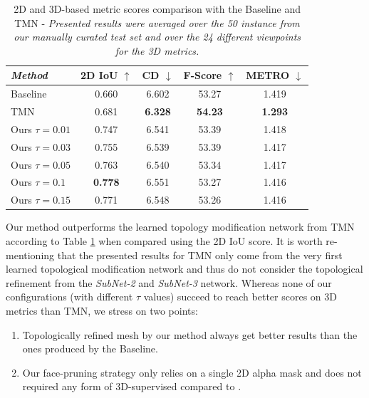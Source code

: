 \begin{table}[htp!]
\begin{center}
\caption{2D and 3D-based metric scores comparison with the Baseline and TMN\citep{pan2019deep} - \textit{Presented results were averaged over the 50 instance from our manually curated test set and over the 24 different viewpoints for the 3D metrics.}} 
\label{tab:sota_table}

\begin{tabular}{|l|c|c|c|c|}
\hline
\textit{Method} & 2D IoU $\uparrow$   & CD $\downarrow$  &F-Score $\uparrow$ & METRO $\downarrow$ \\ 
 \hline\hline
Baseline & 0.660  &  6.602  & 53.27  &  1.419      \\ 
\hline
TMN\citep{pan2019deep} & 0.681  & \textbf{6.328}   & \textbf{54.23}  & \textbf{1.293} \\ 
\hline
Ours $\scriptstyle \tau=0.01$ & 0.747 & 6.541  &  53.39 &  1.418      \\
\hline
Ours $\scriptstyle \tau=0.03$ & 0.755 &6.539  & 53.39  &    1.417  \\
\hline
Ours $\scriptstyle \tau=0.05$ & 0.763 & 6.540  &   53.34 &   1.417     \\
\hline
Ours $\scriptstyle \tau=0.1$ & \textbf{0.778} & 6.551  & 53.27 &  1.416     \\
\hline
Ours $\scriptstyle \tau=0.15$ & 0.771 & 6.548  & 53.26  &    1.416   \\
\hline

%
\end{tabular}
\end{center}

\end{table}

Our method outperforms the learned topology modification network from TMN\citep{pan2019deep} according to Table \ref{tab:sota_table} when compared using the 2D IoU score. It is worth re-mentioning that the presented results for TMN\citep{pan2019deep} only come from the very first learned topological modification network and thus do not consider the topological refinement from the \textit{SubNet-2} and \textit{SubNet-3} network. Whereas none of our configurations (with different $\tau$ values) succeed to reach better scores on 3D metrics than TMN\citep{pan2019deep}, we stress on two points: \begin{enumerate}
    \item Topologically refined mesh by our method always get better results than the ones produced by the Baseline. 
    \item Our face-pruning strategy only relies on a single 2D alpha mask and does not required any form of 3D-supervised compared to \citep{pan2019deep}. 
\end{enumerate}

